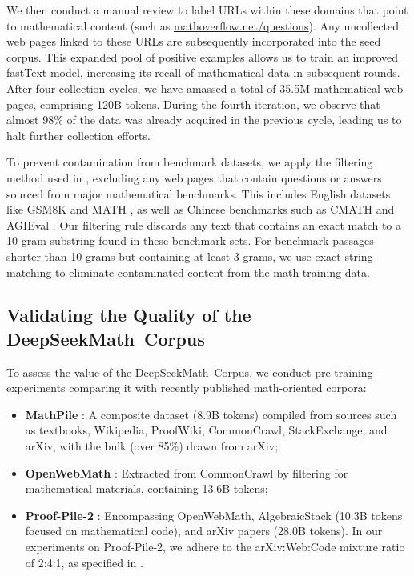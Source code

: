 We then conduct a manual review to label URLs within these domains that point to mathematical content (such as \url{mathoverflow.net/questions}). Any uncollected web pages linked to these URLs are subsequently incorporated into the seed corpus. This expanded pool of positive examples allows us to train an improved fastText model, increasing its recall of mathematical data in subsequent rounds. After four collection cycles, we have amassed a total of 35.5M mathematical web pages, comprising 120B tokens. During the fourth iteration, we observe that almost 98\% of the data was already acquired in the previous cycle, leading us to halt further collection efforts.

To prevent contamination from benchmark datasets, we apply the filtering method used in \cite{deepseek-coder}, excluding any web pages that contain questions or answers sourced from major mathematical benchmarks. This includes English datasets like GSM8K \citep{gsm8k} and MATH \citep{MATH}, as well as Chinese benchmarks such as CMATH \citep{wei2023cmath} and AGIEval \citep{agieval}. Our filtering rule discards any text that contains an exact match to a 10-gram substring found in these benchmark sets. For benchmark passages shorter than 10 grams but containing at least 3 grams, we use exact string matching to eliminate contaminated content from the math training data.

\subsection{Validating the Quality of the DeepSeekMath~Corpus}

To assess the value of the DeepSeekMath~Corpus, we conduct pre-training experiments comparing it with recently published math-oriented corpora:

\begin{itemize}[topsep=0pt]
    \item \textbf{MathPile} \citep{mathpile}: A composite dataset (8.9B tokens) compiled from sources such as textbooks, Wikipedia, ProofWiki, CommonCrawl, StackExchange, and arXiv, with the bulk (over 85\%) drawn from arXiv;
    \item \textbf{OpenWebMath} \citep{openwebmath}: Extracted from CommonCrawl by filtering for mathematical materials, containing 13.6B tokens;
    \item \textbf{Proof-Pile-2} \citep{llemma}: Encompassing OpenWebMath, AlgebraicStack (10.3B tokens focused on mathematical code), and arXiv papers (28.0B tokens). In our experiments on Proof-Pile-2, we adhere to the arXiv:Web:Code mixture ratio of 2:4:1, as specified in \cite{llemma}.
\end{itemize}

